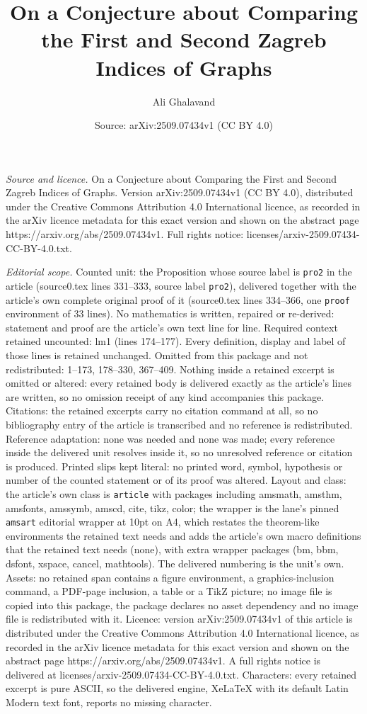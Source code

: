 \documentclass[10pt,a4paper]{amsart}
\title[On a Conjecture about Comparing the First and Second Zagreb ]{On a Conjecture about Comparing the First and Second Zagreb Indices of Graphs}
\author{Ali Ghalavand}
\date{Source: arXiv:2509.07434v1 (CC BY 4.0)}
\begin{document}
\maketitle

\noindent\emph{Source and licence.} On a Conjecture about Comparing the First and Second Zagreb Indices of Graphs. Version arXiv:2509.07434v1 (CC BY 4.0), distributed under the Creative Commons Attribution 4.0 International licence, as recorded in the arXiv licence metadata for this exact version and shown on the abstract page https://arxiv.org/abs/2509.07434v1. Full rights notice: licenses/arxiv-2509.07434-CC-BY-4.0.txt.\par\smallskip

\noindent\textit{Editorial scope.} Counted unit: the Proposition whose source label is \texttt{pro2} in the article (source0.tex lines 331--333, source label \texttt{pro2}), delivered together with the article's own complete original proof of it (source0.tex lines 334--366, one \texttt{proof} environment of 33 lines). No mathematics is written, repaired or re-derived: statement and proof are the article's own text line for line. Required context retained uncounted: lm1 (lines 174--177). Every definition, display and label of those lines is retained unchanged. Omitted from this package and not redistributed: 1--173, 178--330, 367--409. Nothing inside a retained excerpt is omitted or altered: every retained body is delivered exactly as the article's lines are written, so no omission receipt of any kind accompanies this package. Citations: the retained excerpts carry no citation command at all, so no bibliography entry of the article is transcribed and no reference is redistributed. Reference adaptation: none was needed and none was made; every reference inside the delivered unit resolves inside it, so no unresolved reference or citation is produced. Printed slips kept literal: no printed word, symbol, hypothesis or number of the counted statement or of its proof was altered. Layout and class: the article's own class is \texttt{article} with packages including amsmath, amsthm, amsfonts, amssymb, amscd, cite, tikz, color; the wrapper is the lane's pinned \texttt{amsart} editorial wrapper at 10pt on A4, which restates the theorem-like environments the retained text needs and adds the article's own macro definitions that the retained text needs (none), with extra wrapper packages (bm, bbm, dsfont, xspace, cancel, mathtools). The delivered numbering is the unit's own. Assets: no retained span contains a figure environment, a graphics-inclusion command, a PDF-page inclusion, a table or a TikZ picture; no image file is copied into this package, the package declares no asset dependency and no image file is redistributed with it. Licence: version arXiv:2509.07434v1 of this article is distributed under the Creative Commons Attribution 4.0 International licence, as recorded in the arXiv licence metadata for this exact version and shown on the abstract page https://arxiv.org/abs/2509.07434v1. A full rights notice is delivered at licenses/arxiv-2509.07434-CC-BY-4.0.txt. Characters: every retained excerpt is pure ASCII, so the delivered engine, XeLaTeX with its default Latin Modern text font, reports no missing character.
\end{document}
